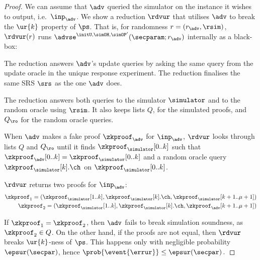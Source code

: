 \begin{proof}
	We can assume that $\adv$ queried the simulator on the instance it wishes to
	output, i.e.~$\inp_{\adv}$. We show a reduction $\rdvur$ that utilises $\adv$ to
	break the $\ur{k}$ property of $\ps$. That is, for randomness $r = (r_\adv, \rsim)$,
	$\rdvur (r)$ runs $\advse^{\initU, \simOH, \simOP'}(\secparam; r_\adv)$ internally as a black-box:
	\begin{compactitem}
		\item The reduction answers $\adv$'s update queries by asking the same query from the
		update oracle in the unique response experiment. The reduction finalises the same
		SRS $\srs$ as the one $\adv$ does.
		\item The reduction answers both queries to the simulator $\simulator$
		and to the random oracle using $\rsim$. It also keeps lists $Q$, for the simulated proofs,
		and $Q_\ro$ for the random oracle queries.
		\item When $\adv$ makes a fake proof $\zkproof_{\adv}$ for $\inp_{\adv}$, $\rdvur$
		looks through lists $Q$ and $Q_\ro$ until it finds $\zkproof_{\simulator}[0..k]$
		such that $\zkproof_{\adv}[0..k] = \zkproof_{\simulator}[0..k]$ and a random
		oracle query $\zkproof_{\simulator}[k].\ch$ on $\zkproof_{\simulator}[0..k]$.
		\item $\rdvur$ returns two proofs for $\inp_{\adv}$:
		\begin{align*}
		\zkproof_1 = (\zkproof_{\simulator}[1..k],
		\zkproof_{\simulator}[k].\ch, \zkproof_{\simulator}[k + 1..\mu + 1])\\
		\zkproof_2 = (\zkproof_{\simulator}[1..k],
		\zkproof_{\simulator}[k].\ch, \zkproof_{\adv}[k + 1..\mu + 1])
		\end{align*}
	\end{compactitem}
	If $\zkproof_1 = \zkproof_2$, then $\adv$ fails to break simulation soundness, as
	$\zkproof_2 \in Q$. On the other hand, if the proofs are not equal, then $\rdvur$
	breaks $\ur{k}$-ness of $\ps$. This happens only with negligible probability
	$\epsur(\secpar)$, hence \( \prob{\event{\errur}} \leq \epsur(\secpar)\,. \)
	
\end{proof}

